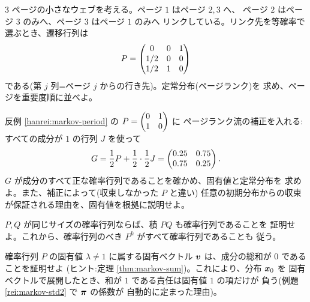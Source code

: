 \begin{mondai}[発展]\label{q:markov-ex9}
$3$ ページの小さなウェブを考える。ページ $1$ はページ $2, 3$ へ、
ページ $2$ はページ $3$ のみへ、ページ $3$ はページ $1$ のみへ
リンクしている。リンク先を等確率で選ぶとき、遷移行列は
\[
P = \begin{pmatrix}0 & 0 & 1 \\ 1/2 & 0 & 0 \\ 1/2 & 1 & 0\end{pmatrix}
\]
である(第 $j$ 列=ページ $j$ からの行き先)。定常分布(ページランク)を
求め、ページを重要度順に並べよ。
\end{mondai}

\begin{mondai}[発展]\label{q:markov-ex10}
反例 \ref{hanrei:markov-period} の $P = \begin{pmatrix}0 & 1 \\ 1 & 0\end{pmatrix}$ に
ページランク流の補正を入れる:すべての成分が $1$ の行列 $J$ を使って
\[
G = \frac{1}{2}P + \frac{1}{2} \cdot \frac{1}{2}J
= \begin{pmatrix}0.25 & 0.75 \\ 0.75 & 0.25\end{pmatrix}.
\]
$G$ が成分のすべて正な確率行列であることを確かめ、固有値と定常分布を
求めよ。また、補正によって(収束しなかった $P$ と違い)
任意の初期分布からの収束が保証される理由を、固有値を根拠に説明せよ。
\end{mondai}

\begin{mondai}[証明]\label{q:markov-ex11}
$P, Q$ が同じサイズの確率行列ならば、積 $PQ$ も確率行列であることを
証明せよ。これから、確率行列のべき $P^k$ がすべて確率行列であることも
従う。
\end{mondai}

\begin{mondai}[証明]\label{q:markov-ex12}
確率行列 $P$ の固有値 $\lambda \neq 1$ に属する固有ベクトル
$\bm{v}$ は、成分の総和が $0$ であることを証明せよ
(ヒント:定理 \ref{thm:markov-sum})。これにより、分布 $\bm{x}_0$ を
固有ベクトルで展開したとき、和が $1$ である責任は固有値 $1$ の項だけが
負う(例題 \ref{rei:markov-std2} で $\bm{\pi}$ の係数が
自動的に定まった理由)。
\end{mondai}

